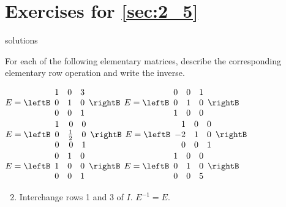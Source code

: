 \section*{Exercises for \ref{sec:2_5}}

\begin{Filesave}{solutions}
\end{Filesave}

\begin{multicols}{2}
\begin{ex}
For each of the following elementary matrices, describe the corresponding elementary row operation and write the inverse.
\begin{exenumerate}
\exitem $E = \leftB \begin{array}{rrr}
1 & 0 & 3 \\
0 & 1 & 0 \\
0 & 0 & 1
\end{array} \rightB$
\exitem $E = \leftB \begin{array}{rrr}
0 & 0 & 1 \\
0 & 1 & 0 \\
1 & 0 & 0
\end{array} \rightB$
\exitem $E = \leftB \begin{array}{rrr}
1 & 0 & 0 \\
0 & \frac{1}{2} & 0 \\
0 & 0 & 1
\end{array} \rightB$
\exitem $E = \leftB \begin{array}{rrr}
1 & 0 & 0 \\
-2 & 1 & 0 \\
0 & 0 & 1
\end{array} \rightB$
\exitem $E = \leftB \begin{array}{rrr}
0 & 1 & 0 \\
1 & 0 & 0 \\
0 & 0 & 1
\end{array} \rightB$
\exitem $E = \leftB \begin{array}{rrr}
1 & 0 & 0 \\
0 & 1 & 0 \\
0 & 0 & 5
\end{array} \rightB$
\end{exenumerate}
\begin{sol}
\begin{enumerate}[label={\alph*.}]
\setcounter{enumi}{1}
\item Interchange rows 1 and 3 of $I$. $E^{-1} = E$.


\end{enumerate}
\end{sol}
\end{ex}
\end{multicols}
